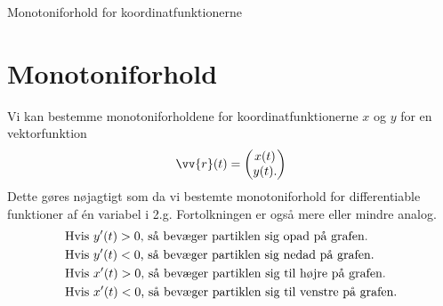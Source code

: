 \begin{center}
	\Huge
	Monotoniforhold for koordinatfunktionerne
\end{center}
\section*{Monotoniforhold}

Vi kan bestemme monotoniforholdene for koordinatfunktionerne $x$ og $y$ for en vektorfunktion
\begin{align*}
	\vv{r}(t) = 
	\begin{pmatrix}
		x(t) \\
		y(t).
	\end{pmatrix}
\end{align*}
Dette gøres nøjagtigt som da vi bestemte monotoniforhold for differentiable funktioner af én variabel i 2.g. Fortolkningen er også mere eller mindre analog. 
\begin{align*}
	&\textnormal{Hvis $y'(t)>0$, så bevæger partiklen sig opad på grafen.}\\
	&\textnormal{Hvis $y'(t)<0$, så bevæger partiklen sig nedad på grafen.}\\
	&\textnormal{Hvis $x'(t)>0$, så bevæger partiklen sig til højre på grafen.}\\
	&\textnormal{Hvis $x'(t)<0$, så bevæger partiklen sig til venstre på grafen.}\\
\end{align*}

